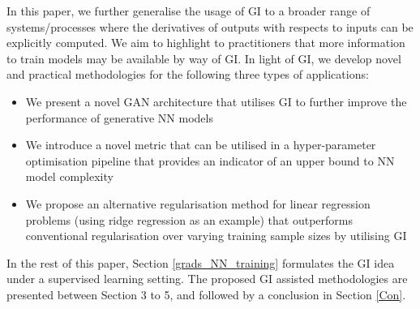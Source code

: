 \documentclass{article}
\begin{document}



In this paper, we further generalise the usage of GI to a broader range of systems/processes where the derivatives of outputs with respects to inputs can be explicitly computed. We aim to highlight to practitioners that more information to train models may be available by way of GI. In light of GI, we develop novel and practical methodologies for the following three types of applications: 
\begin{itemize}
    \item We present a novel GAN architecture that utilises GI to further improve the performance of generative NN models
	\item We introduce a novel metric that can be utilised in a hyper-parameter optimisation pipeline that provides an indicator of an upper bound to NN model complexity
	\item We propose an alternative regularisation method for linear regression problems (using ridge regression as an example) that outperforms conventional regularisation over varying training sample sizes by utilising GI
\end{itemize}

In the rest of this paper, Section \ref{grads_NN_training} formulates the GI idea under a supervised learning setting. The proposed GI assisted methodologies are presented between Section 3 to 5, and followed by a conclusion in Section \ref{Con}. 
\end{document}
